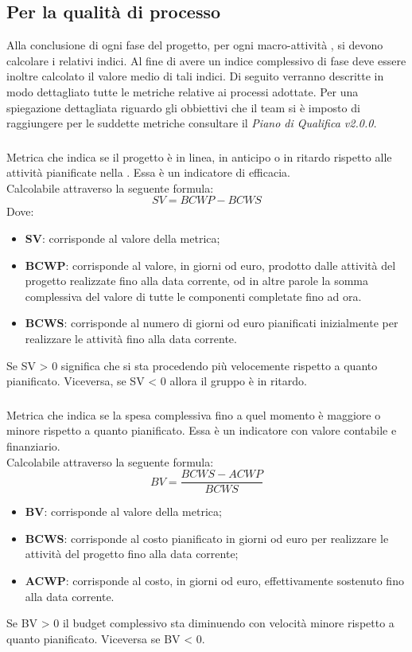 \subsection{Per la qualità di processo}
Alla conclusione di ogni fase del progetto, per ogni macro-attività , si devono calcolare i relativi indici. Al fine di avere un indice complessivo di fase deve essere inoltre calcolato il valore medio di tali indici. Di seguito verranno descritte in modo dettagliato tutte le metriche relative ai processi adottate. Per una spiegazione dettagliata riguardo gli obbiettivi che il team si è imposto di raggiungere per le suddette metriche consultare il \emph{Piano di Qualifica v2.0.0.}
\subsubsection{}
Metrica che indica se il progetto è in linea, in anticipo o in ritardo rispetto alle attività pianificate nella . Essa è un indicatore di efficacia. \\
Calcolabile attraverso la seguente formula:
\[ SV=BCWP-BCWS\]
Dove:
\begin{itemize}
	\item {\textbf{SV}: corrisponde al valore della metrica;}
	\item {\textbf{BCWP}: corrisponde al valore, in giorni od euro, prodotto dalle attività del progetto realizzate fino alla data corrente, od in altre parole la somma complessiva del valore di tutte le componenti completate fino ad ora.}
	\item {\textbf{BCWS}: corrisponde al numero di giorni od euro pianificati inizialmente per realizzare le attività fino alla data corrente.}
\end{itemize}
Se SV > 0 significa che si sta procedendo più velocemente rispetto a quanto pianificato. Viceversa, se SV < 0 allora il gruppo è in ritardo.
\subsubsection{}
Metrica che indica se la spesa complessiva fino a quel momento è maggiore o minore rispetto a quanto pianificato. Essa è un indicatore con valore contabile e finanziario. \\
Calcolabile attraverso la seguente formula:
\[BV=\frac{BCWS-ACWP}{BCWS}\]
\begin{itemize}
	\item {\textbf{BV}: corrisponde al valore della metrica;}
	\item {\textbf{BCWS}: corrisponde al costo pianificato in giorni od euro per realizzare le attività del progetto fino alla data corrente;}
	\item {\textbf{ACWP}: corrisponde al costo, in giorni od euro, effettivamente sostenuto fino alla data corrente.}
\end{itemize}
Se BV > 0 il budget complessivo sta diminuendo con velocità minore rispetto a quanto pianificato. Viceversa se BV < 0.
